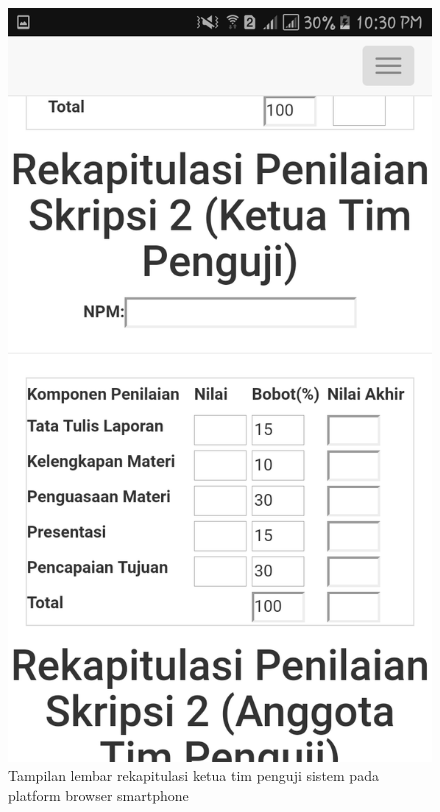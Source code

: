 \begin{figure}[H]
	\centering
	\includegraphics[scale=0.2]{Gambar/hp_ketua}
	\caption{Tampilan lembar rekapitulasi ketua tim penguji sistem pada platform browser smartphone}
	\label{fig:hp_ketua}
\end{figure}

